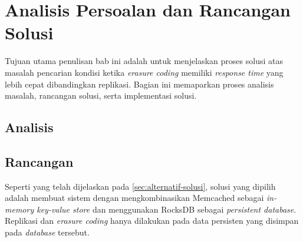\chapter{Analisis Persoalan dan Rancangan Solusi}
\label{chapter:analisis-persoalan-dan-rancangan-solusi}

Tujuan utama penulisan bab ini adalah untuk menjelaskan proses solusi atas masalah pencarian kondisi ketika \textit{erasure coding} memiliki \textit{response time} yang lebih cepat dibandingkan replikasi. Bagian ini memaparkan proses analisis masalah, rancangan solusi, serta implementasi solusi.


\section{Analisis}







\section{Rancangan}

Seperti yang telah dijelaskan pada \ref{sec:alternatif-solusi}, solusi yang dipilih adalah membuat sistem dengan mengkombinasikan Memcached sebagai \textit{in-memory key-value store} dan menggunakan RocksDB sebagai \textit{persistent database}. Replikasi dan \textit{erasure coding} hanya dilakukan pada data persisten yang disimpan pada \textit{database} tersebut.





